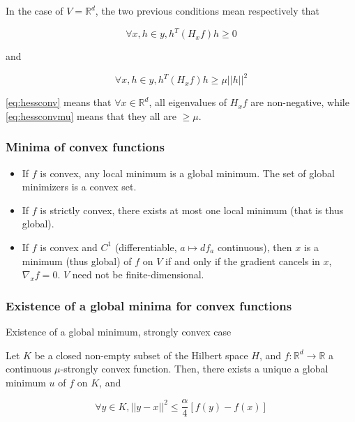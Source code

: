 \documentclass[
10pt, %
a4paper, %
oneside, %
headinclude,footinclude, %
BCOR5mm, %
]{scrartcl}
\begin{document}
\begin{remark}
    In the case of $V= \mathbb{R}^d$, the two previous conditions mean respectively that 

	    \begin{equation}
		\label{eq:hessconv}
		\forall x, h\in y, h^T(H_xf)h\geq 0
	    \end{equation}

	    and

	    \begin{equation}
		\label{eq:hessconvmu}
		\forall x, h\in y, h^T(H_xf)h\geq \mu ||h||^2
	    \end{equation}

	    \ref{eq:hessconv} means that $\forall x\in \mathbb{R}^d$, all eigenvalues of $H_xf$ are non-negative, while \ref{eq:hessconvmu} means that they all are $\geq \mu$.



\end{remark}

\subsubsection{\large\color{Periwinkle}Minima of convex functions}

\begin{proposition}
    \label{prop:miniconv}

    \begin{itemize}
        \item If $f$ is convex, any local minimum is a global minimum. The set of global minimizers is a convex set.
	\item If $f$ is strictly convex, there exists at most one local minimum (that is thus global).
	\item If $f$ is convex and $C^1$ (differentiable, $a\mapsto df_a$ continuous), then $x$ is a minimum (thus global) of $f$ on $V$ if and only if the gradient cancels in $x$, $\nabla_xf=0$. $V$ need not be finite-dimensional.
    \end{itemize}
\end{proposition}

\subsubsection{\large\color{Periwinkle}Existence of a global minima for convex functions}

\begin{theorem}{Existence of a global minimum, strongly convex case}
    \label{th:alphaconv}

    Let $K$ be a closed non-empty subset of the Hilbert space $H$, and $f: \mathbb{R}^d\rightarrow \mathbb{R} $ a continuous $\mu$-strongly convex function. Then, there exists a unique a global minimum $u$ of $f$ on $K$, and

    \begin{equation*}
	\forall y\in K, ||y-x||^2\leq \frac{ \alpha}{4} [ f(y)-f(x)]
    \end{equation*}
\end{theorem}
\end{document}
